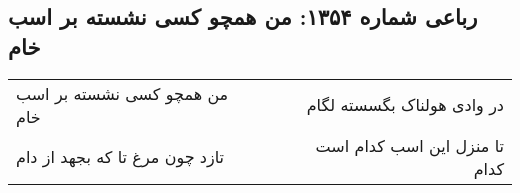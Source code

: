 \begin{center}
\section*{رباعی شماره ۱۳۵۴: من همچو کسی نشسته بر اسب خام}
\label{sec:1354}
\begin{longtable}{l p{0.5cm} r}
من همچو کسی نشسته بر اسب خام
&&
در وادی هولناک بگسسته لگام
\\
تازد چون مرغ تا که بجهد از دام
&&
تا منزل این اسب کدام است کدام
\\
\end{longtable}
\end{center}
